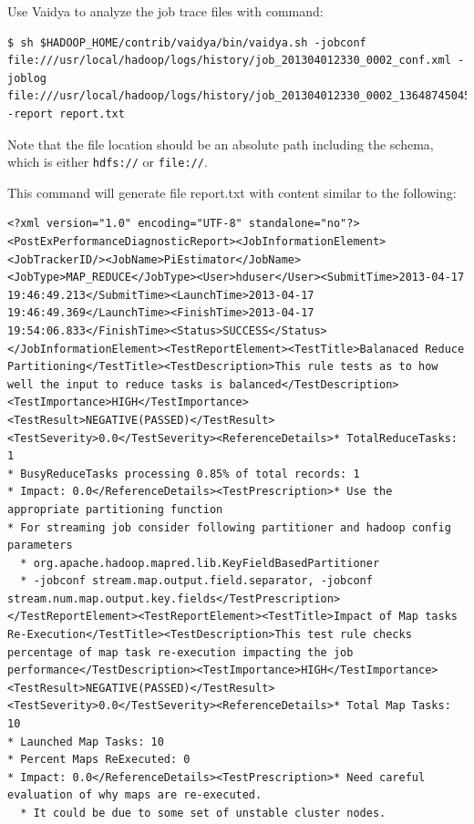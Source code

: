 Use Vaidya to analyze the job trace files with command:
\lstset{style=bashstyle}
\begin{lstlisting}
$ sh $HADOOP_HOME/contrib/vaidya/bin/vaidya.sh -jobconf file:///usr/local/hadoop/logs/history/job_201304012330_0002_conf.xml -joblog file:///usr/local/hadoop/logs/history/job_201304012330_0002_1364874504561_hduser_TeraGen -report report.txt
\end{lstlisting}

\begin{info}
Note that the file location should be an absolute path including the schema, which is either \verb|hdfs://| or \verb|file://|.
\end{info}

This command will generate file report.txt with content similar to the following:
\lstset{style=bashstyle}
\begin{lstlisting}
<?xml version="1.0" encoding="UTF-8" standalone="no"?><PostExPerformanceDiagnosticReport><JobInformationElement><JobTrackerID/><JobName>PiEstimator</JobName><JobType>MAP_REDUCE</JobType><User>hduser</User><SubmitTime>2013-04-17 19:46:49.213</SubmitTime><LaunchTime>2013-04-17 19:46:49.369</LaunchTime><FinishTime>2013-04-17 19:54:06.833</FinishTime><Status>SUCCESS</Status></JobInformationElement><TestReportElement><TestTitle>Balanaced Reduce Partitioning</TestTitle><TestDescription>This rule tests as to how well the input to reduce tasks is balanced</TestDescription><TestImportance>HIGH</TestImportance>
<TestResult>NEGATIVE(PASSED)</TestResult>
<TestSeverity>0.0</TestSeverity><ReferenceDetails>* TotalReduceTasks: 1
* BusyReduceTasks processing 0.85% of total records: 1
* Impact: 0.0</ReferenceDetails><TestPrescription>* Use the appropriate partitioning function
* For streaming job consider following partitioner and hadoop config parameters
  * org.apache.hadoop.mapred.lib.KeyFieldBasedPartitioner
  * -jobconf stream.map.output.field.separator, -jobconf stream.num.map.output.key.fields</TestPrescription></TestReportElement><TestReportElement><TestTitle>Impact of Map tasks Re-Execution</TestTitle><TestDescription>This test rule checks percentage of map task re-execution impacting the job performance</TestDescription><TestImportance>HIGH</TestImportance>
<TestResult>NEGATIVE(PASSED)</TestResult>
<TestSeverity>0.0</TestSeverity><ReferenceDetails>* Total Map Tasks: 10
* Launched Map Tasks: 10
* Percent Maps ReExecuted: 0
* Impact: 0.0</ReferenceDetails><TestPrescription>* Need careful evaluation of why maps are re-executed.
  * It could be due to some set of unstable cluster nodes.

\end{lstlisting}
